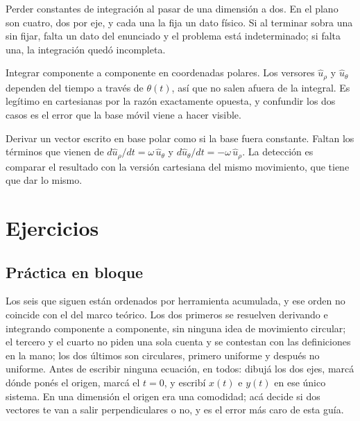 \documentclass[11pt,openany]{book}
\begin{document}
\begin{erroresComunes}
  \item Perder constantes de integración al pasar de una dimensión a dos. En el plano son cuatro, dos por eje, y cada una la fija un dato físico. Si al terminar sobra una sin fijar, falta un dato del enunciado y el problema está indeterminado; si falta una, la integración quedó incompleta.
  \item Integrar componente a componente en coordenadas polares. Los versores $\hat u_\rho$ y $\hat u_\theta$ dependen del tiempo a través de $\theta(t)$, así que no salen afuera de la integral. Es legítimo en cartesianas por la razón exactamente opuesta, y confundir los dos casos es el error que la base móvil viene a hacer visible.
  \item Derivar un vector escrito en base polar como si la base fuera constante. Faltan los términos que vienen de $d\hat u_\rho/dt = \omega\,\hat u_\theta$ y $d\hat u_\theta/dt = -\omega\,\hat u_\rho$. La detección es comparar el resultado con la versión cartesiana del mismo movimiento, que tiene que dar lo mismo.
\end{erroresComunes}

\section{Ejercicios}

\subsection{Práctica en bloque}

Los seis que siguen están ordenados por herramienta acumulada, y ese orden no coincide con el del marco teórico. Los dos primeros se resuelven derivando e integrando componente a componente, sin ninguna idea de movimiento circular; el tercero y el cuarto no piden una sola cuenta y se contestan con las definiciones en la mano; los dos últimos son circulares, primero uniforme y después no uniforme. Antes de escribir ninguna ecuación, en todos: dibujá los dos ejes, marcá dónde ponés el origen, marcá el $t = 0$, y escribí $x(t)$ e $y(t)$ en ese único sistema. En una dimensión el origen era una comodidad; acá decide si dos vectores te van a salir perpendiculares o no, y es el error más caro de esta guía.
\end{document}
